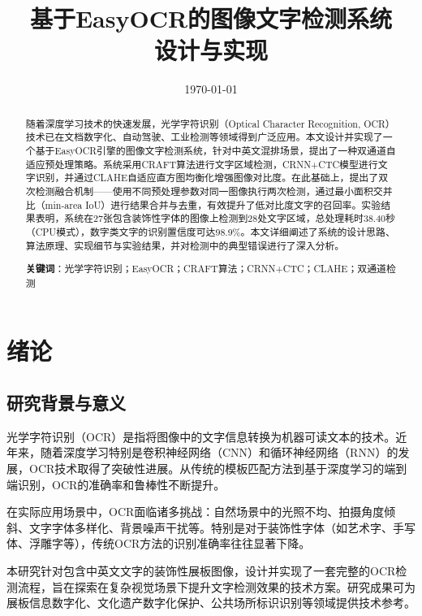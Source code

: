 \documentclass[12pt,hyperref,a4paper,UTF8]{ctexart}
\title{\textbf{基于EasyOCR的图像文字检测系统\\设计与实现}}
\author{}
\date{\today}
\begin{document}
\maketitle

\begin{abstract}

随着深度学习技术的快速发展，光学字符识别（Optical Character Recognition, OCR）技术已在文档数字化、自动驾驶、工业检测等领域得到广泛应用。本文设计并实现了一个基于EasyOCR引擎的图像文字检测系统，针对中英文混排场景，提出了一种双通道自适应预处理策略。系统采用CRAFT算法进行文字区域检测，CRNN+CTC模型进行文字识别，并通过CLAHE自适应直方图均衡化增强图像对比度。在此基础上，提出了双次检测融合机制——使用不同预处理参数对同一图像执行两次检测，通过最小面积交并比（min-area IoU）进行结果合并与去重，有效提升了低对比度文字的召回率。实验结果表明，系统在27张包含装饰性字体的图像上检测到28处文字区域，总处理耗时38.40秒（CPU模式），数字类文字的识别置信度可达98.9\%。本文详细阐述了系统的设计思路、算法原理、实现细节与实验结果，并对检测中的典型错误进行了深入分析。

\vspace{1em}
\textbf{关键词}：光学字符识别；EasyOCR；CRAFT算法；CRNN+CTC；CLAHE；双通道检测
\end{abstract}

\thispagestyle{empty}

\newpage
\tableofcontents

\newpage

\section{绪论}

\subsection{研究背景与意义}

光学字符识别（OCR）是指将图像中的文字信息转换为机器可读文本的技术。近年来，随着深度学习特别是卷积神经网络（CNN）和循环神经网络（RNN）的发展，OCR技术取得了突破性进展。从传统的模板匹配方法到基于深度学习的端到端识别，OCR的准确率和鲁棒性不断提升。

在实际应用场景中，OCR面临诸多挑战：自然场景中的光照不均、拍摄角度倾斜、文字字体多样化、背景噪声干扰等。特别是对于装饰性字体（如艺术字、手写体、浮雕字等），传统OCR方法的识别准确率往往显著下降。

本研究针对包含中英文文字的装饰性展板图像，设计并实现了一套完整的OCR检测流程，旨在探索在复杂视觉场景下提升文字检测效果的技术方案。研究成果可为展板信息数字化、文化遗产数字化保护、公共场所标识识别等领域提供技术参考。
\end{document}
